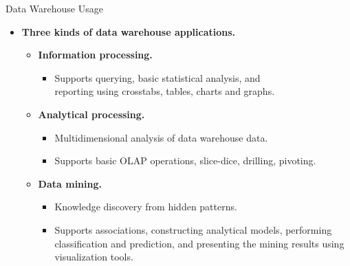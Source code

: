 \begin{frame}{Data Warehouse Usage}
	\begin{itemize}
		\item \textbf{Three kinds of data warehouse applications.}
		      \begin{itemize}
			      \item \textbf{\color{airforceblue}Information processing.}
			            \begin{itemize}
				            \item Supports querying, basic statistical analysis, and \\ reporting using crosstabs, tables, charts and graphs.
			            \end{itemize}
			      \item \textbf{\color{airforceblue}Analytical processing.}
			            \begin{itemize}
				            \item Multidimensional analysis of data warehouse data.
				            \item Supports basic OLAP operations, slice-dice, drilling, pivoting.
			            \end{itemize}
			      \item \textbf{\color{airforceblue}Data mining.}
			            \begin{itemize}
				            \item Knowledge discovery from hidden patterns.
				            \item Supports associations, constructing analytical models, performing classification and prediction, and presenting the mining results using visualization tools.
			            \end{itemize}
		      \end{itemize}
	\end{itemize}
\end{frame}

